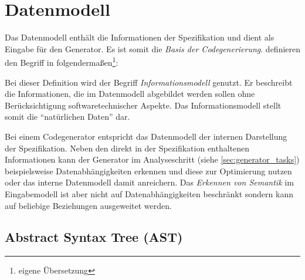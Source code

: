 \section{Datenmodell}
\label{sec:datamodel}

Das Datenmodell enthält die Informationen der Spezifikation und dient als Eingabe für den Generator. Es ist somit die \emph{Basis der Codegenerierung}. \citeauthor{rfc3198} definieren den Begriff in \cite{rfc3198} folgendermaßen\footnote{eigene Übersetzung}:


Bei dieser Definition wird der Begriff \emph{Informationsmodell} genutzt. Er beschreibt die Informationen, die im Datenmodell abgebildet werden sollen ohne Berücksichtigung softwaretechnischer Aspekte. Das Informationsmodell stellt somit die \enquote{natürlichen Daten} dar.

Bei einem Codegenerator entspricht das Datenmodell der internen Darstellung der Spezifikation. Neben den direkt in der Spezifikation enthaltenen Informationen kann der Generator im Analyseschritt (siehe \cref{sec:generator_tasks}) beispielsweise Datenabhängigkeiten erkennen und diese zur Optimierung nutzen oder das interne Datenmodell damit anreichern. Das \emph{Erkennen von Semantik} im Eingabemodell ist aber nicht auf Datenabhängigkeiten beschränkt sondern kann auf beliebige Beziehungen ausgeweitet werden. 

\subsection{Abstract Syntax Tree (AST)}
\label{sec:ast}

